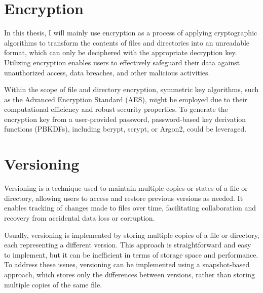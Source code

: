 \section{Encryption}\label{sec:encryption-approaches}

In this thesis, I will mainly use encryption as a process of applying cryptographic algorithms to transform the contents of files and directories into an unreadable format, which can only be deciphered with the appropriate decryption key.
Utilizing encryption enables users to effectively safeguard their data against unauthorized access, data breaches, and other malicious activities.

Within the scope of file and directory encryption, symmetric key algorithms, such as the Advanced Encryption Standard (AES), might be employed due to their computational efficiency and robust security properties.
To generate the encryption key from a user-provided password, password-based key derivation functions (PBKDFs), including bcrypt, scrypt, or Argon2, could be leveraged.


\section{Versioning}\label{sec:versioning}

Versioning is a technique used to maintain multiple copies or states of a file or directory, allowing users to access and restore previous versions as needed.
It enables tracking of changes made to files over time, facilitating collaboration and recovery from accidental data loss or corruption.

Usually, versioning is implemented by storing multiple copies of a file or directory, each representing a different version.
This approach is straightforward and easy to implement, but it can be inefficient in terms of storage space and performance.
To address these issues, versioning can be implemented using a snapshot-based approach, which stores only the differences between versions, rather than storing multiple copies of the same file.